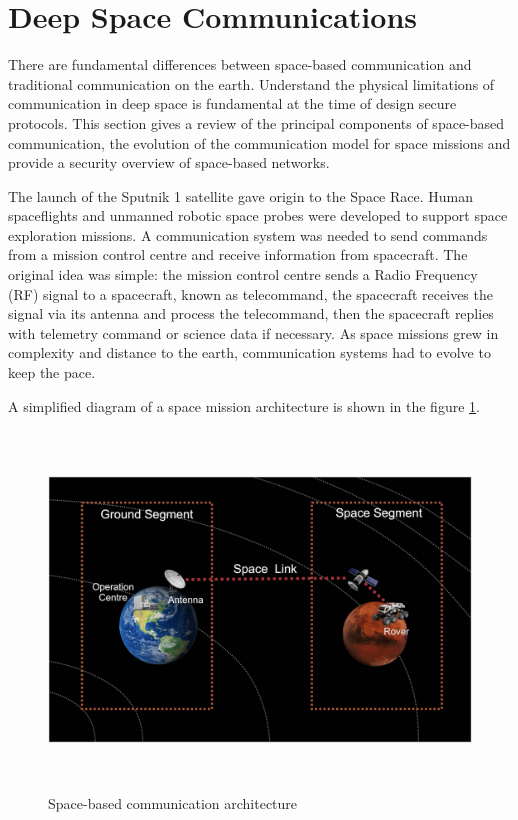 \section{Deep Space Communications}
\label{sec:space}

There are fundamental differences between space-based communication and traditional communication on the earth. Understand the physical limitations of communication in deep space is fundamental at the time of design secure protocols. This section gives a review of the principal components of space-based communication, the evolution of the communication model for space missions and provide a security overview of space-based networks.

The launch of the Sputnik 1 satellite gave origin to the Space Race. Human spaceflights and unmanned robotic space probes were developed to support space exploration missions. A communication system was needed to send commands from a mission control centre and receive information from spacecraft. The original idea was simple: the mission control centre sends a Radio Frequency (RF) signal to a spacecraft, known as telecommand, the spacecraft receives the signal via its antenna and process the telecommand, then the spacecraft replies with telemetry command or science data if necessary. As space missions grew in complexity and distance to the earth, communication systems had to evolve to keep the pace. 

A simplified diagram of a space mission architecture is shown in the figure \ref{fig:space-based-arc}.  


\begin{figure}[ht]
\centering
\includegraphics[width=1 \linewidth, height=9.5cm]{images/ground.png} 
\caption{Space-based communication architecture}
\label{fig:space-based-arc}
\end{figure}

